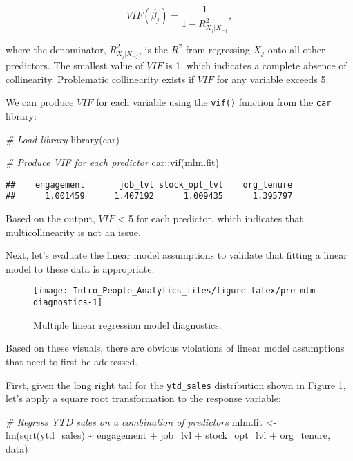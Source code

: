 \documentclass[
]{book}
\newenvironment{Shaded}{\begin{snugshade}}{\end{snugshade}}
\newcommand{\CommentTok}[1]{\textcolor[rgb]{0.56,0.35,0.01}{\textit{#1}}}
\newcommand{\FunctionTok}[1]{\textcolor[rgb]{0.00,0.00,0.00}{#1}}
\newcommand{\NormalTok}[1]{#1}
\newcommand{\OtherTok}[1]{\textcolor[rgb]{0.56,0.35,0.01}{#1}}
\newcommand{\SpecialCharTok}[1]{\textcolor[rgb]{0.00,0.00,0.00}{#1}}
\begin{document}
\[ VIF(\hat{\beta_j}) = \frac{1}{1 - R^2_{X_j|X_{-j}}}, \]

where the denominator, \(R^2_{X_j|X_{-j}}\), is the \(R^2\) from regressing \(X_j\) onto all other predictors. The smallest value of \(VIF\) is 1, which indicates a complete absence of collinearity. Problematic collinearity exists if \(VIF\) for any variable exceeds 5.

We can produce \(VIF\) for each variable using the \texttt{vif()} function from the \texttt{car} library:

\begin{Shaded}
\begin{Highlighting}[]
\CommentTok{\# Load library}
\FunctionTok{library}\NormalTok{(car)}

\CommentTok{\# Produce VIF for each predictor}
\NormalTok{car}\SpecialCharTok{::}\FunctionTok{vif}\NormalTok{(mlm.fit)}
\end{Highlighting}
\end{Shaded}

\begin{verbatim}
##    engagement       job_lvl stock_opt_lvl    org_tenure 
##      1.001459      1.407192      1.009435      1.395797
\end{verbatim}

Based on the output, \(VIF\) \textless{} 5 for each predictor, which indicates that multicollinearity is not an issue.

Next, let's evaluate the linear model assumptions to validate that fitting a linear model to these data is appropriate:

\begin{figure}

{\centering \texttt{[image: Intro\_People\_Analytics\_files/figure-latex/pre-mlm-diagnostics-1]} 

}

\caption{Multiple linear regression model diagnostics.}\label{fig:pre-mlm-diagnostics}
\end{figure}

Based on these visuals, there are obvious violations of linear model assumptions that need to first be addressed.

First, given the long right tail for the \texttt{ytd\_sales} distribution shown in Figure \ref{fig:pre-mlm-diagnostics}, let's apply a square root transformation to the response variable:

\begin{Shaded}
\begin{Highlighting}[]
\CommentTok{\# Regress YTD sales on a combination of predictors}
\NormalTok{mlm.fit }\OtherTok{\textless{}{-}} \FunctionTok{lm}\NormalTok{(}\FunctionTok{sqrt}\NormalTok{(ytd\_sales) }\SpecialCharTok{\textasciitilde{}}\NormalTok{ engagement }\SpecialCharTok{+}\NormalTok{ job\_lvl }\SpecialCharTok{+}\NormalTok{ stock\_opt\_lvl }\SpecialCharTok{+}\NormalTok{ org\_tenure, data)}
\end{Highlighting}
\end{Shaded}
\end{document}
